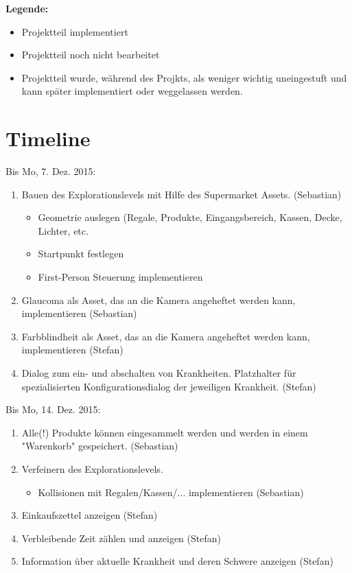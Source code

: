 \documentclass[a4paper, 11pt]{scrartcl}
\title{\documenttitle}
\author{\authors}
\date{\dateversion}
\newcommand{\fertig}{\color{ForestGreen}}
\newcommand{\unwichtig}{\color{Gray}}
\newcommand{\entwickler}[1]{\textcolor{BurntOrange}{(#1)}}
\newcommand{\Stefan}{\entwickler{Stefan}}
\newcommand{\Sebastian}{\entwickler{Sebastian}}
\begin{document}
\maketitle

{\bfseries Legende:}
\begin{itemize}
    \item {\fertig Projektteil implementiert}
    \item {Projektteil noch nicht bearbeitet}
    \item {\unwichtig Projektteil wurde, während des Projkts, als weniger
    wichtig uneingestuft und kann später implementiert oder weggelassen werden.}
\end{itemize}


\section{Timeline}
Bis Mo, 7. Dez. 2015:
\begin{enumerate}
    \item Bauen des Explorationslevels mit Hilfe des Supermarket Assets. \Sebastian
    \begin{itemize}
        \item Geometrie auslegen (Regale, Produkte, Eingangsbereich, Kassen, Decke, Lichter, etc.
        \item Startpunkt festlegen
        \item First-Person Steuerung implementieren
    \end{itemize}
    \item Glaucoma als Asset, das an die Kamera angeheftet werden kann, implementieren \Sebastian
    \item Farbblindheit als Asset, das an die Kamera angeheftet werden kann, implementieren \Stefan
    \item Dialog zum ein- und abschalten von Krankheiten. Platzhalter für spezialisierten Konfigurationsdialog der jeweiligen Krankheit. \Stefan
\end{enumerate}
Bis Mo, 14. Dez. 2015:
\begin{enumerate}
    \item Alle(!) Produkte können eingesammelt werden und werden in einem "Warenkorb" gespeichert. \Sebastian
    \item Verfeinern des Explorationslevels.
    \begin{itemize}
        \item Kollisionen mit Regalen/Kassen/... implementieren \Sebastian
    \end{itemize}
    \item Einkaufszettel anzeigen \Stefan
    \item Verbleibende Zeit zählen und anzeigen \Stefan
    \item Information über aktuelle Krankheit und deren Schwere anzeigen \Stefan
\end{enumerate}
\end{document}
